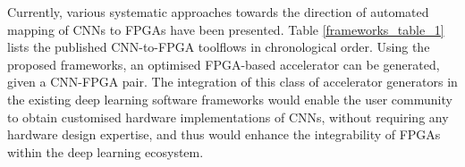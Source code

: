\documentclass[format=acmsmall, review=false, screen=true]{acmart}
\begin{document}

Currently, various systematic approaches towards the direction of automated mapping of CNNs to FPGAs have been presented. Table \ref{frameworks_table_1} lists the published CNN-to-FPGA toolflows in chronological order. Using the proposed frameworks, an optimised FPGA-based accelerator can be generated, given a CNN-FPGA pair. The integration of this class of accelerator generators in the existing deep learning software frameworks would enable the user community to obtain customised hardware implementations of CNNs, without requiring any hardware design expertise, and thus would enhance the integrability of FPGAs within the deep learning ecosystem.

\begin{table}[t]
\centering
\vspace{-0.2cm}
\caption{CNN-to-FPGA Toolflows %
}
\vspace{-0.25cm}
\label{frameworks_table_1}
\end{table}
\end{document}
